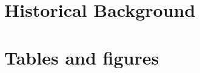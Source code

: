 \documentclass{article}
\begin{document}

\section{Historical Background}






\newpage
\onehalfspacing



\newpage
\section*{Tables and figures}
\end{document}
